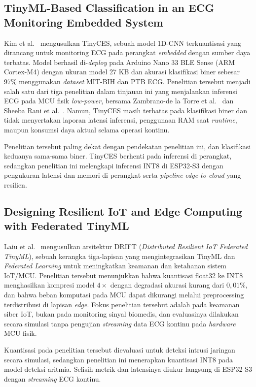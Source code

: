 \subsection{TinyML-Based Classification in an ECG Monitoring Embedded System}

Kim et al.~\cite{kim_2023} mengusulkan TinyCES, sebuah model 1D-CNN terkuantisasi yang dirancang untuk monitoring ECG pada perangkat \textit{embedded} dengan sumber daya terbatas. Model berhasil di-\textit{deploy} pada Arduino Nano 33 BLE Sense (ARM Cortex-M4) dengan ukuran model 27 KB dan akurasi klasifikasi biner sebesar 97\% menggunakan \textit{dataset} MIT-BIH dan PTB ECG. Penelitian tersebut menjadi salah satu dari tiga penelitian dalam tinjauan ini yang menjalankan inferensi ECG pada MCU fisik \textit{low-power}, bersama Zambrano-de la Torre et al.~\cite{zambrano_2026} dan Sheeba Rani et al.~\cite{sheeba_rani_2026}. Namun, TinyCES masih terbatas pada klasifikasi biner dan tidak menyertakan laporan latensi inferensi, penggunaan RAM saat \textit{runtime}, maupun konsumsi daya aktual selama operasi kontinu.

Penelitian tersebut paling dekat dengan pendekatan penelitian ini, dan klasifikasi keduanya sama-sama biner. TinyCES berhenti pada inferensi di perangkat, sedangkan penelitian ini melengkapi inferensi INT8 di ESP32-S3 dengan pengukuran latensi dan memori di perangkat serta \textit{pipeline} \textit{edge-to-cloud} yang resilien.

\subsection{Designing Resilient IoT and Edge Computing with Federated TinyML}

Laiu et al.~\cite{laiu_2026} mengusulkan arsitektur DRIFT (\textit{Distributed Resilient IoT Federated TinyML}), sebuah kerangka tiga-lapisan yang mengintegrasikan TinyML dan \textit{Federated Learning} untuk meningkatkan keamanan dan ketahanan sistem IoT/MCU. Penelitian tersebut menunjukkan bahwa kuantisasi float32 ke INT8 menghasilkan kompresi model $4\times$ dengan degradasi akurasi kurang dari $0{,}01\%$, dan bahwa beban komputasi pada MCU dapat dikurangi melalui preprocessing terdistribusi di lapisan \textit{edge}. Fokus penelitian tersebut adalah pada keamanan siber IoT, bukan pada monitoring sinyal biomedis, dan evaluasinya dilakukan secara simulasi tanpa pengujian \textit{streaming} data ECG kontinu pada \textit{hardware} MCU fisik.

Kuantisasi pada penelitian tersebut dievaluasi untuk deteksi intrusi jaringan secara simulasi, sedangkan penelitian ini menerapkan kuantisasi INT8 pada model deteksi aritmia. Selisih metrik dan latensinya diukur langsung di ESP32-S3 dengan \textit{streaming} ECG kontinu.


